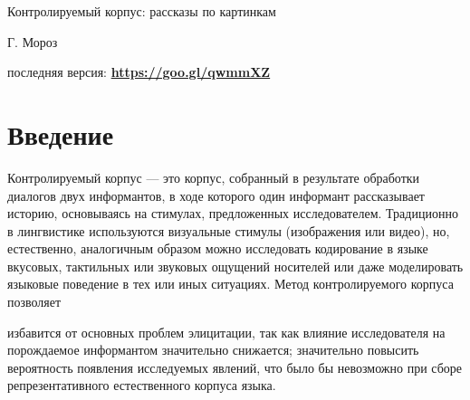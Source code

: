 

\begin{center}{\Large Контролируемый корпус: рассказы по картинкам}
\end{center}
\begin{flushright}
	{\footnotesize Г. Мороз}
\end{flushright}
{\noindent\footnotesize последняя версия: \textbf{\href{https://goo.gl/qwmmXZ}{https://goo.gl/qwmmXZ}}}
\vspace{5mm}
\section{Введение}
\noindent Контролируемый корпус --- это корпус, собранный в результате обработки диалогов двух информантов, в ходе которого один информант рассказывает историю, основываясь на стимулах, предложенных исследователем. Традиционно в лингвистике используются визуальные стимулы (изображения или видео), но, естественно, аналогичным образом можно исследовать кодирование в языке вкусовых, тактильных или звуковых ощущений носителей или даже моделировать языковые поведение в тех или иных ситуациях. Метод контролируемого корпуса позволяет
\begin{itemize}
\mytem  избавится от основных проблем элицитации, так как влияние исследователя на порождаемое информантом значительно снижается;
\mytem значительно повысить вероятность появления исследуемых явлений, что было бы невозможно при сборе репрезентативного естественного корпуса языка.
\end{itemize}
